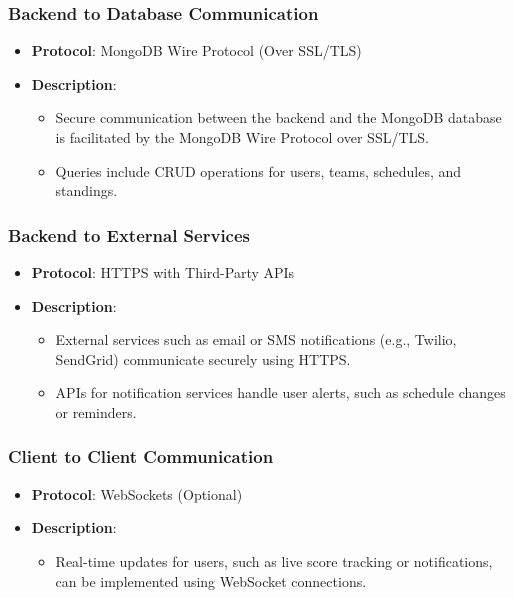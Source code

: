 \documentclass[12pt, titlepage]{article}
\begin{document}
\subsubsection*{Backend to Database Communication}
\begin{itemize}
    \item \textbf{Protocol}: MongoDB Wire Protocol (Over SSL/TLS)
    \item \textbf{Description}:
    \begin{itemize}
        \item Secure communication between the backend and the MongoDB database is facilitated by the MongoDB Wire Protocol over SSL/TLS.
        \item Queries include CRUD operations for users, teams, schedules, and standings.
    \end{itemize}
\end{itemize}

\subsubsection*{Backend to External Services}
\begin{itemize}
    \item \textbf{Protocol}: HTTPS with Third-Party APIs
    \item \textbf{Description}:
    \begin{itemize}
        \item External services such as email or SMS notifications (e.g., Twilio, SendGrid) communicate securely using HTTPS.
        \item APIs for notification services handle user alerts, such as schedule changes or reminders.
    \end{itemize}
\end{itemize}

\subsubsection*{Client to Client Communication}
\begin{itemize}
    \item \textbf{Protocol}: WebSockets (Optional)
    \item \textbf{Description}:
    \begin{itemize}
        \item Real-time updates for users, such as live score tracking or notifications, can be implemented using WebSocket connections.
    \end{itemize}
\end{itemize}
\end{document}
